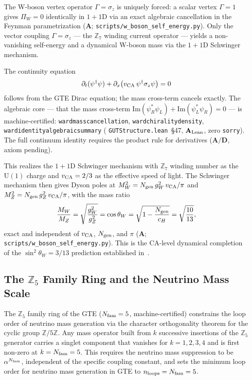 \documentclass[11pt]{article}
\theoremstyle{remark}
\newcommand{\Nfam}{N_{\rm fam}}
\newcommand{\lean}[1]{%
  \penalty-100
  \begingroup\def\_{\textunderscore\allowbreak}\texttt{#1}\endgroup}
\newcommand{\CatA}{\textbf{A}}
\newcommand{\CatAL}{\ensuremath{\textbf{A}_{\rm Lean}}}
\newcommand{\CatAD}{\textbf{A/D}}
\begin{document}
The W-boson vertex operator $\Gamma = \sigma_z$ is uniquely forced: a scalar vertex $\Gamma = 1$ gives $\Pi_W = 0$ identically in $1{+}1$D via an exact algebraic cancellation in the Feynman parametrization ($\CatA$; \texttt{scripts/w\_boson\_self\_energy.py}).
Only the vector coupling $\Gamma = \sigma_z$ — the $\mathbb{Z}_7$ winding current operator — yields a non-vanishing self-energy and a dynamical W-boson mass via the $1{+}1$D Schwinger mechanism.

The continuity equation
\[
  \partial_t(\psi^\dagger\psi) + \partial_x\bigl(v_{\rm CA}\,\psi^\dagger\sigma_z\psi\bigr) = 0
\]
follows from the GTE Dirac equation; the mass cross-term cancels exactly.
The algebraic core — that the mass cross-term $\mathrm{Im}(\psi_R^*\psi_L) + \mathrm{Im}(\psi_L^*\psi_R) = 0$ — is machine-certified:
\lean{ward\_mass\_cancellation}, \lean{ward\_chirality\_density}, \lean{ward\_identity\_algebraic\_summary}
(\lean{GUTStructure.lean}~\S47, $\CatAL$, zero \texttt{sorry}).
The full continuum identity requires the product rule for derivatives ($\CatAD$, axiom pending).

This realizes the $1{+}1$D Schwinger mechanism with $\mathbb{Z}_7$ winding number as the $\mathrm{U}(1)$ charge and $v_{\rm CA} = 2/3$ as the effective speed of light.
The Schwinger mechanism then gives Dyson poles at $M_W^2 = N_{\rm gen}\,g_W^2\,v_{\rm CA}/\pi$ and $M_Z^2 = N_{\rm gen}\,g_Z^2\,v_{\rm CA}/\pi$, with the mass ratio
\[
  \frac{M_W}{M_Z} = \sqrt{\frac{g_W^2}{g_Z^2}} = \cos\theta_W = \sqrt{1 - \frac{N_{\rm gen}}{c_H}} = \sqrt{\frac{10}{13}},
\]
exact and independent of $v_{\rm CA}$, $N_{\rm gen}$, and $\pi$ ($\CatA$; \texttt{scripts/w\_boson\_self\_energy.py}).
This is the CA-level dynamical completion of the $\sin^2\theta_W = 3/13$ prediction established in~\cite{SpivackWeinberg}.

\subsection{The \texorpdfstring{$\mathbb{Z}_5$}{Z5} Family Ring and the Neutrino Mass Scale}
\label{sec:z5_neutrino}

The $\mathbb{Z}_5$ family ring of the GTE ($\Nfam = 5$, machine-certified) constrains
the loop order of neutrino mass generation via the character orthogonality theorem
for the cyclic group $\mathbb{Z}/5\mathbb{Z}$.
Any mass operator built from $k$ successive insertions of the $\mathbb{Z}_5$ generator
carries a singlet component that vanishes for $k = 1, 2, 3, 4$ and is first non-zero
at $k = \Nfam = 5$.
This requires the neutrino mass suppression to be $\alpha^{\Nfam}$, independent of the
specific coupling constant, and sets the minimum loop order for neutrino mass generation
in GTE to $n_{\rm loops} = \Nfam = 5$.
\end{document}
